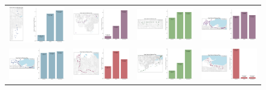 \documentclass[b4paper]{article}
\begin{document}
\begin{figure}
\begin{center}
\begin{tabular}{ cccc }
  \includegraphics[width=44mm]{Route_52.png}  &   \includegraphics[width=44mm]{Route_55.png}  & \includegraphics[width=44mm]{Route_67.png}  & \includegraphics[width=44mm]{Route_70.png} \\ 
  
  \includegraphics[width=44mm]{Route_72.png}  &   \includegraphics[width=44mm]{Route_73.png}  & \includegraphics[width=44mm]{Route_75.png}  & \includegraphics[width=44mm]{Route_80.png} \\ 
  

\end{tabular}
\end{center}
\end{figure}
\end{document}
